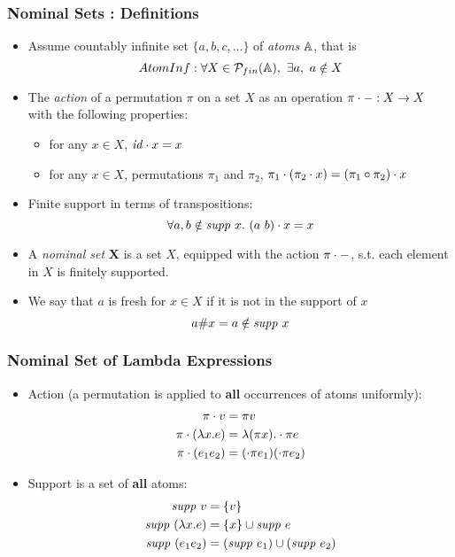\documentclass[10pt]{beamer}
\begin{document}
\begin{frame}
  \frametitle{Nominal Sets : Definitions}
  \begin{itemize}
  \item Assume countably infinite set $\{a,b,c,\dots \}$ of \emph{atoms} $\mathbb{A}$, that is
    \[ AtomInf : \forall X \in \mathcal{P}_{fin}(\mathbb{A}),~\exists a,~a \notin X\]
  \item The \emph{action} of a permutation $\pi$ on a set $X$ as an operation
    $\pi \cdot -:  X -> X$ with the following properties:
    \begin{itemize}
    \item for any $x\in X$, $\mathit{id} \cdot x = x$
    \item for any $x\in X$, permutations $\pi_1$ and $\pi_2$, $\pi_1 \cdot (\pi_2 \cdot x) = (\pi_1 \circ \pi_2) \cdot x$
    \end{itemize}
  \item Finite support in terms of transpositions:
    \[ \forall a,b \notin \mathit{supp}~ x.~(a ~ b) \cdot x = x \]
  \item A \emph{nominal set} \textbf{X} is a set $X$, equipped with the action
    $\pi \cdot -$, s.t. each element in $X$ is finitely supported.
  \item We say that $a$ is fresh for $x \in X$ if it is not in the support of $x$
   \[ a \# x = a \notin \mathit{supp}~ x\]
  \end{itemize}
\end{frame}

\begin{frame}
  \frametitle{Nominal Set of Lambda Expressions}
  \begin{itemize}
  \item Action (a permutation is applied to \textbf{all} occurrences of atoms uniformly):
    \begin{align*}
    \action \pi v &= \pi v\\
    \action \pi {(\lambda x.e)} &= \lambda (\pi x). \action \pi e\\
    \action \pi {(e_1 e_2)} &= (\action \pi {e_1}) (\action \pi {e_2})
    \end{align*}
  \item Support is a set of \textbf{all} atoms:
    \begin{align*}
    \mathit{supp}~ v &= \{v\}\\
    \mathit{supp}~ (\lambda x.e) &= \{x\} \cup \mathit{supp}~ e\\
    \mathit{supp}~ (e_1 e_2) & = (\mathit{supp}~ e_1) \cup (\mathit{supp}~ e_2)
  \end{align*}
  \end{itemize}
\end{frame}
\end{document}
